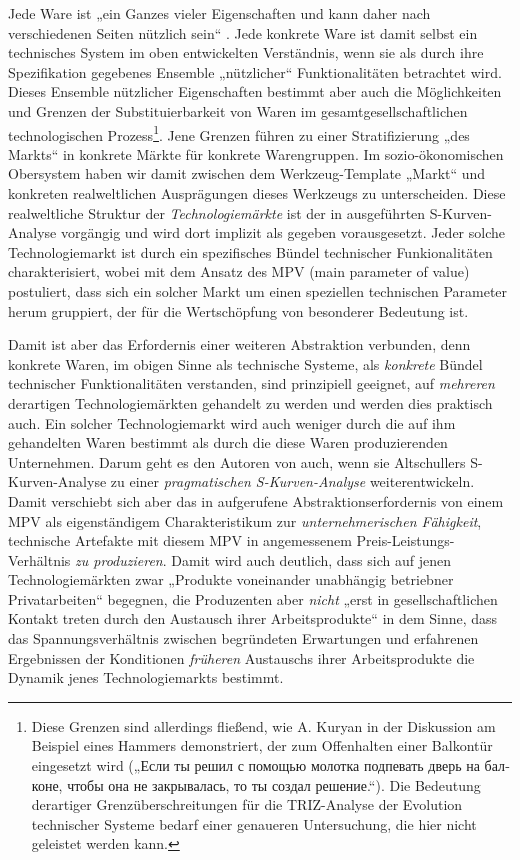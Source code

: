 \documentclass[11pt,a4paper]{article}
\begin{document}
Jede Ware ist „ein Ganzes vieler Eigenschaften und kann daher nach
verschiedenen Seiten nützlich sein“ \cite[S. 49]{MEW23}. Jede konkrete Ware
ist damit selbst ein technisches System im oben entwickelten Verständnis, wenn
sie als durch ihre Spezifikation gegebenes Ensemble „nützlicher“
Funktionalitäten betrachtet wird. Dieses Ensemble nützlicher Eigenschaften
bestimmt aber auch die Möglichkeiten und Grenzen der Substituierbarkeit von
Waren im gesamtgesellschaftlichen technologischen Prozess\footnote{Diese
  Grenzen sind allerdings fließend, wie A. Kuryan in der Diskussion
  \cite{Graebe2019b} am Beispiel eines Hammers demonstriert, der zum
  Offenhalten einer Balkontür eingesetzt wird (\foreignlanguage{russian}{„Если
    ты решил с помощью молотка подпевать дверь на балконе, чтобы она не
    закрывалась, то ты создал решение.“}). Die Bedeutung derartiger
  Grenzüberschreitungen für die TRIZ-Analyse der Evolution technischer Systeme
  bedarf einer genaueren Untersuchung, die hier nicht geleistet werden kann.}.
Jene Grenzen führen zu einer Stratifizierung „des Markts“ in konkrete Märkte
für konkrete Warengruppen. Im sozio-ökonomischen Obersystem haben wir damit
zwischen dem Werkzeug-Template „Markt“ und konkreten realweltlichen
Ausprägungen dieses Werkzeugs zu unterscheiden. Diese realweltliche Struktur
der \emph{Technologiemärkte} ist der in \cite{TESE2018} ausgeführten
S-Kurven-Analyse vorgängig und wird dort implizit als gegeben vorausgesetzt.
Jeder solche Technologiemarkt ist durch ein spezifisches Bündel technischer
Funkionalitäten charakterisiert, wobei \cite{TESE2018} mit dem Ansatz des MPV
(main parameter of value) postuliert, dass sich ein solcher Markt um einen
speziellen technischen Parameter herum gruppiert, der für die Wertschöpfung
von besonderer Bedeutung ist.

Damit ist aber das Erfordernis einer weiteren Abstraktion verbunden, denn
konkrete Waren, im obigen Sinne als technische Systeme, als \emph{konkrete}
Bündel technischer Funktionalitäten verstanden, sind prinzipiell geeignet, auf
\emph{mehreren} derartigen Technologiemärkten gehandelt zu werden und werden
dies praktisch auch. Ein solcher Technologiemarkt wird auch weniger durch die
auf ihm gehandelten Waren bestimmt als durch die diese Waren produzierenden
Unternehmen. Darum geht es den Autoren von \cite{TESE2018} auch, wenn sie
Altschullers S-Kurven-Analyse zu einer \emph{pragmatischen S-Kurven-Analyse}
weiterentwickeln.  Damit verschiebt sich aber das in \cite{TESE2018}
aufgerufene Abstraktionserfordernis von einem MPV als eigenständigem
Charakteristikum zur \emph{unternehmerischen Fähigkeit}, technische Artefakte
mit diesem MPV in angemessenem Preis-Leistungs-Verhältnis \emph{zu
  produzieren}.  Damit wird auch deutlich, dass sich auf jenen
Technologiemärkten zwar „Produkte voneinander unabhängig betriebner
Privatarbeiten“ begegnen, die Produzenten aber \emph{nicht} „erst in
gesellschaftlichen Kontakt treten durch den Austausch ihrer Arbeitsprodukte“
\cite[S. 87]{MEW23} in dem Sinne, dass das Spannungsverhältnis zwischen
begründeten Erwartungen und erfahrenen Ergebnissen der Konditionen
\emph{früheren} Austauschs ihrer Arbeitsprodukte die Dynamik jenes
Technologiemarkts bestimmt.  
\end{document}
